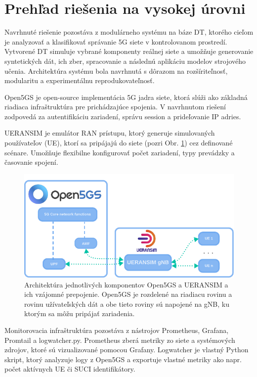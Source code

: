 \section{Prehľad riešenia na vysokej úrovni}

Navrhnuté riešenie pozostáva z modulárneho systému na báze DT, ktorého cieľom je analyzovať a klasifikovať správanie 5G siete v kontrolovanom prostredí. Vytvorené DT simuluje vybrané komponenty reálnej siete a umožňuje generovanie syntetických dát, ich zber, spracovanie a následnú aplikáciu modelov strojového učenia. Architektúra systému bola navrhnutá s dôrazom na rozšíriteľnosť, modularitu a experimentálnu reprodukovateľnosť.

Open5GS je open-source implementácia 5G jadra siete, ktorá slúži ako základná riadiaca infraštruktúra pre prichádzajúce spojenia. V navrhnutom riešení zodpovedá za autentifikáciu zariadení, správu session a prideľovanie IP adries.

UERANSIM je emulátor RAN prístupu, ktorý generuje simulovaných používateľov (UE), ktorí sa pripájajú do siete (pozri Obr. \ref{fig:architecture}) cez definované scénare. Umožňuje flexibilne konfigurovať počet zariadení, typy prevádzky a časovanie spojení.

\begin{figure}[H]
    \centering
    \includegraphics[width=0.75\linewidth]{assets//images/core-ue.png}
    \caption[Architektúra komponentov Open5GS a UERANSIM]{Architektúra jednotlivých komponentov Open5GS a UERANSIM a ich vzájomné prepojenie. Open5GS je rozdelené na riadiacu rovinu a rovinu užívateľských dát a obe tieto roviny sú napojené na gNB, ku ktorým sa môžu pripájať zariadenia.}
    \label{fig:architecture}
\end{figure}

Monitorovacia infraštruktúra pozostáva z nástrojov Prometheus, Grafana, Promtail a logwatcher.py. Prometheus zberá metriky zo siete a systémových zdrojov, ktoré sú vizualizované pomocou Grafany. Logwatcher je vlastný Python skript, ktorý analyzuje logy z Open5GS a exportuje vlastné metriky ako napr. počet aktívnych UE či SUCI identifikátory.

